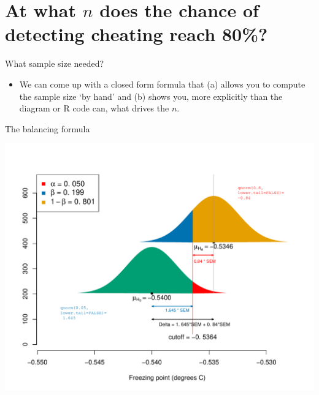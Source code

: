 \documentclass[handout]{beamer}\usepackage[]{graphicx}\usepackage[]{color}
\newenvironment{knitrout}{}{} %
\begin{document}
\section{At what $n$ does the chance of detecting cheating reach 80\%?}

\begin{frame}{What sample size needed?}

\begin{itemize}
	\item We can come up with a closed form formula that (a) allows you to compute the sample size `by hand' and (b) shows you, more explicitly than the diagram or R code can, what drives the $n$.

\end{itemize}

\end{frame}

\begin{frame}[fragile]{The balancing formula}
\begin{knitrout}\scriptsize
{}\color{fgcolor}

{\centering \includegraphics[width=1\linewidth]{figure/unnamed-chunk-13-1} 

}



\end{knitrout}
\end{frame}
\end{document}
